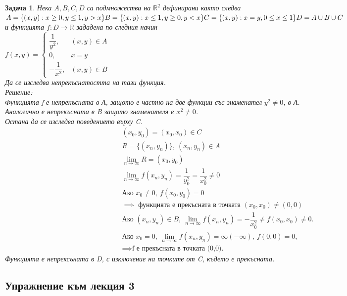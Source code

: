 \documentclass[a4paper,fleqn,12pt]{article}
\newtheorem{task}{Задача}[section]
\begin{document}
\begin{task}
Нека $A,B,C,D$ са подмножества на $\mathbb{R}^2$ дефинирани както следва \\
$
A = \{ (x,y): x \geq 0, y \leq 1, y>x \} \\
B = \{ (x,y): x \leq 1, y \geq 0, y<x \} \\
C = \{ (x,y): x = y , 0 \leq x \leq 1 \} \\
D = A \cup B \cup C
$ \\
и функцията $f: D \to \mathbb{R} $ зададена по следния начин \\
$f(x,y) = 
\begin{cases}
\dfrac{1}{y^2}, & (x,y)\in A \\
0, & x = y \\
-\dfrac{1}{x^2}, & (x,y)\in B
\end{cases}$\\ 
Да се изследва непрекъснатостта на тази функция. \\
Решение:\\
Функцията f е непрекъсната в А, защото е частно на две функции със знаменател $y^2\neq 0$, в А.\\
Аналогично е непрекъсната в B защото знаменателя е $x^2 \neq 0$.\\
Остана да се изследва поведението върху C. \\
\begin{gather*}
(x_0,y_0) = (x_0, x_0) \in C \\
R = \{ (x_n , y_n) \},\ (x_n , y_n) \in A \\
\lim\limits_{n \to \infty} R = (x_0, y_0)\\
\lim\limits_{n \to \infty} f(x_n,y_n) = \dfrac{1}{y_0 ^2} = \dfrac{1}{x_0 ^2} \neq 0\\
\text{Ако } x_0 \neq 0, \ f(x_0,y_0) = 0 \\
\implies \text{ функцията е прекъсната в точката } (x_0, x_0) \neq (0,0) \\
\text{Ако } (x_n , y_n) \in B,\ \lim\limits_{n \to \infty} f(x_n,y_n) = - \dfrac{1}{x_0 ^2} \neq f(x_0, x_0) \neq 0. \\
\text{Ако } x_0 = 0,\ \lim\limits_{n \to \infty} f(x_n,y_n) = \infty(-\infty),\ f(0,0) = 0,\\
\implies \text{f е прекъсната в точката (0,0).} 
\end{gather*}
Функцията е непрексъната в D, с изключение на точките от C, където е прекъсната. 
\end{task}

\newpage
\subsection{Упражнение към лекция 3}
\end{document}
